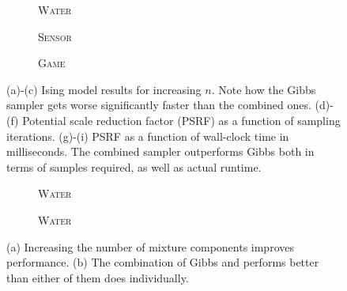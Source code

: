 \begin{figure}[t!]
  \begin{subfigure}[b]{\subflen}
    \centering
    
    \vspace{\scspacey}
    \caption{\hspace{\scspacex}\textsc{Water}}
    \label{fig:water1-time}
  \end{subfigure}
  \begin{subfigure}[b]{\subflen}
    
    \vspace{\scspacey}
    \caption{\hspace{\scspacex}\textsc{Sensor}}
    \label{fig:berkeley1-time}
  \end{subfigure}
  \begin{subfigure}[b]{\subflen}
    
    \vspace{\scspacey}
    \caption{\hspace{\scspacex}\textsc{Game}}
    \label{fig:hots1-time}
  \end{subfigure}
  \caption{
    (a)-(c) Ising model results for increasing $n$. Note how the Gibbs sampler gets worse significantly faster than the combined ones.
    (d)-(f) Potential scale reduction factor (PSRF) as a function of sampling iterations.
    (g)-(i) PSRF as a function of wall-clock time in milliseconds.
    The combined sampler outperforms Gibbs both in terms of samples required, as well as actual runtime.
  }
  \label{fig:expising}
\end{figure}

\setlength{}
\setlength{}
\renewcommand{\subflen}{0.46\textwidth}
\renewcommand{\scspacey}{-0.3em}
\renewcommand{\scspacex}{0.2em}
\begin{figure}[t!]
  \centering
  \begin{subfigure}[b]{\subflen}
    \centering
    
    \vspace{\scspacey}
    \caption{\hspace{\scspacex}\textsc{Water}}
    \label{fig:water2}
  \end{subfigure}
  \hspace{1em}
  \begin{subfigure}[b]{\subflen}
    
    \vspace{\scspacey}
    \caption{\hspace{\scspacex}\textsc{Water}}
    \label{fig:water3}
  \end{subfigure}
  \caption{
    (a) Increasing the number of mixture components improves performance.
    (b) The combination of Gibbs and \Ms{} performs better than either of them does individually.
  }
  \label{fig:exp2}
\end{figure}

